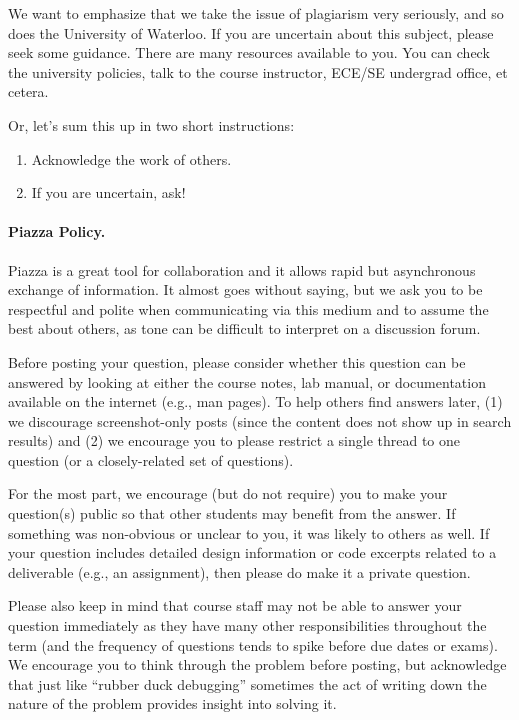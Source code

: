 \documentclass[letterpaper,10pt]{article}
\begin{document}
We want to emphasize that we take the issue of plagiarism very seriously, and so does the University of Waterloo. If you are uncertain about this subject, please seek some guidance. There are many resources available to you. You can check the university policies, talk to the course instructor, ECE/SE undergrad office, et cetera.

Or, let's sum this up in two short instructions:
\begin{enumerate}
	\item Acknowledge the work of others. 
	\item If you are uncertain, ask!
\end{enumerate}

\paragraph{Piazza Policy.}
Piazza is a great tool for collaboration and it allows rapid but asynchronous exchange of information. It almost goes without saying, but we ask you to be respectful and polite when communicating via this medium and to assume the best about others, as tone can be difficult to interpret on a discussion forum. 

Before posting your question, please consider whether this question can be answered by looking at either the course notes, lab manual, or documentation available on the internet (e.g., man pages). To help others find answers later, (1) we discourage screenshot-only posts (since the content does not show up in search results) and (2) we encourage you to please restrict a single thread to one question (or a closely-related set of questions).

For the most part, we encourage (but do not require) you to make your question(s) public so that other students may benefit from the answer. If something was non-obvious or unclear to you, it was likely to others as well. If your question includes detailed design information or code excerpts related to a deliverable (e.g., an assignment), then please do make it a private question.

Please also keep in mind that course staff may not be able to answer your question immediately as they have many other responsibilities throughout the term (and the frequency of questions tends to spike before due dates or exams). We encourage you to think through the problem before posting, but acknowledge that just like ``rubber duck debugging'' sometimes the act of writing down the nature of the problem provides insight into solving it.
\end{document}
